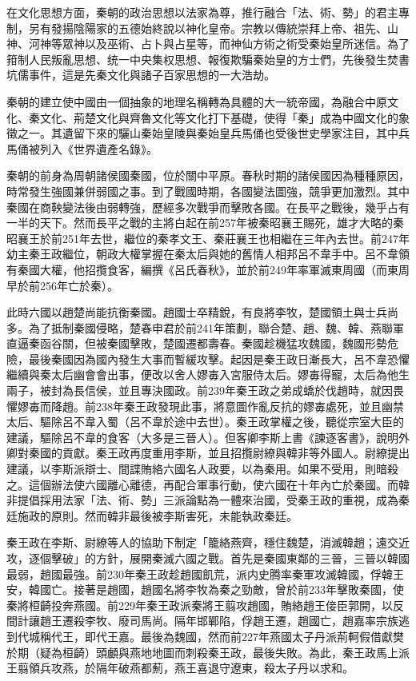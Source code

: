 在文化思想方面，秦朝的政治思想以法家為尊，推行融合「法、術、勢」的君主專制，另有發揚陰陽家的五德始終說以神化皇帝。宗教以傳統崇拜上帝、祖先、山神、河神等眾神以及巫術、占卜與占星等，而神仙方術之術受秦始皇所迷信。為了箝制人民叛亂思想、统一中央集权思想、報復欺騙秦始皇的方士們，先後發生焚書坑儒事件，這是先秦文化與諸子百家思想的一大浩劫。

秦朝的建立使中國由一個抽象的地理名稱轉為具體的大一統帝國，為融合中原文化、秦文化、荊楚文化與齊魯文化等文化打下基礎，使得「秦」成為中國文化的象徵之一。其遺留下來的驪山秦始皇陵與秦始皇兵馬俑也受後世史學家注目，其中兵馬俑被列入《世界遺產名錄》。

秦朝的前身為周朝諸侯國秦國，位於關中平原。春秋时期的諸侯國因為種種原因，時常發生強國兼併弱國之事。到了戰國時期，各國變法圖強，競爭更加激烈。其中秦國在商鞅變法後由弱轉強，歷經多次戰爭而擊敗各國。在長平之戰後，幾乎占有一半的天下。然而長平之戰的主將白起在前257年被秦昭襄王賜死，雄才大略的秦昭襄王於前251年去世，繼位的秦孝文王、秦莊襄王也相繼在三年內去世。前247年幼主秦王政繼位，朝政大權掌握在秦太后與她的舊情人相邦呂不韋手中。呂不韋領有秦國大權，他招攬食客，編撰《呂氏春秋》，並於前249年率軍滅東周國（而東周早於前256年亡於秦）。

此時六國以趙楚尚能抗衡秦國。趙國士卒精銳，有良將李牧，楚國領土與士兵尚多。為了抵制秦國侵略，楚春申君於前241年策劃，聯合楚、趙、魏、韓、燕聯軍直逼秦函谷關，但被秦國擊敗，楚國遷都壽春。秦國趁機猛攻魏國，魏國形勢危險，最後秦國因為國內發生大事而暫緩攻擊。起因是秦王政日漸長大，呂不韋恐懼繼續與秦太后幽會會出事，便改以舍人嫪毐入宮服侍太后。嫪毐得寵，太后為他生兩子，被封為長信侯，並且專決國政。前239年秦王政之弟成蟜於伐趙時，就因畏懼嫪毐而降趙。前238年秦王政發現此事，將意圖作亂反抗的嫪毐處死，並且幽禁太后、驅除呂不韋入蜀（呂不韋於途中去世）。秦王政掌權之後，聽從宗室大臣的建議，驅除呂不韋的食客（大多是三晉人）。但客卿李斯上書《諫逐客書》，說明外卿對秦國的貢獻。秦王政再度重用李斯，並且招攬尉繚與韓非等外國人。尉繚提出建議，以李斯派辯士、間諜賄絡六國名人政要，以為秦用。如果不受用，則暗殺之。這個辦法使六國離心離德，再配合軍事行動，使六國在十年內亡於秦國。而韓非提倡採用法家「法、術、勢」三派論點為一體來治國，受秦王政的重視，成為秦廷施政的原則。然而韓非最後被李斯害死，未能執政秦廷。

秦王政在李斯、尉繚等人的協助下制定「籠絡燕齊，穩住魏楚，消滅韓趙；遠交近攻，逐個擊破」的方針，展開秦滅六國之戰。首先是秦國東鄰的三晉，三晉以韓國最弱，趙國最強。前230年秦王政趁趙國飢荒，派内史腾率秦軍攻滅韓國，俘韓王安，韓國亡。接著是趙國，趙國名將李牧為秦之勁敵，曾於前233年擊敗秦國，使秦將桓齮投奔燕國。前229年秦王政派秦將王翦攻趙國，賄絡趙王倿臣郭開，以反間計讓趙王遷殺李牧、廢司馬尚。隔年邯鄲陷，俘趙王遷，趙國亡，趙嘉率宗族逃到代城稱代王，即代王嘉。最後為魏國，然而前227年燕國太子丹派荊軻假借獻樊於期（疑為桓齮）頭顱與燕地地圖而刺殺秦王政，最後失敗。為此，秦王政馬上派王翦領兵攻燕，於隔年破燕都薊，燕王喜退守遼東，殺太子丹以求和。

